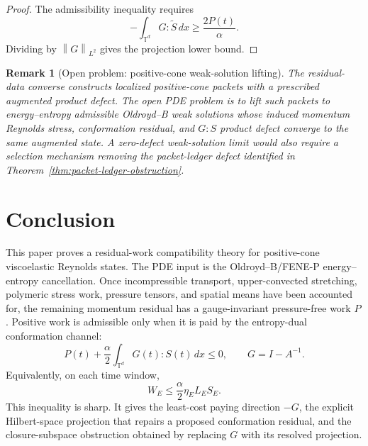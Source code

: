 \documentclass[11pt]{article}
\numberwithin{equation}{section}
\newtheorem{remark}[theorem]{Remark}
\newcommand{\T}{\mathbb T}
\newcommand{\norm}[1]{\left\lVert #1\right\rVert}
\begin{document}
\begin{proof}
The admissibility inequality requires
\[
  -\int_{\T^d}G:\widetilde S\,dx
  \ge \frac{2P(t)}{\alpha}.
\]
Dividing by \(\norm{G}_{L^2}\) gives the projection lower bound.
\end{proof}

\begin{remark}[Open problem: positive-cone weak-solution lifting]
\label{rem:realization-open}
The residual-data converse constructs localized positive-cone packets with a
prescribed augmented product defect.  The open PDE problem is to lift such
packets to energy--entropy admissible Oldroyd--B weak solutions whose induced
momentum Reynolds stress, conformation residual, and \(G:S\) product defect
converge to the same augmented state.  A zero-defect weak-solution limit would
also require a selection mechanism removing the packet-ledger defect identified
in Theorem~\ref{thm:packet-ledger-obstruction}.
\end{remark}

\section{Conclusion}

This paper proves a residual-work compatibility theory for positive-cone
viscoelastic Reynolds states.  The PDE input is the Oldroyd--B/FENE-P
energy--entropy cancellation.  Once incompressible transport, upper-convected
stretching, polymeric stress work, pressure tensors, and spatial means have
been accounted for, the remaining momentum residual has a gauge-invariant
pressure-free work \(P\).  Positive work is admissible only when it is paid by
the entropy-dual conformation channel:
\[
  P(t)+\frac{\alpha}{2}\int_{\T^d}G(t):S(t)\,dx\le0,
  \qquad G=I-A^{-1}.
\]
Equivalently, on each time window,
\[
  W_E\le \frac{\alpha}{2}\eta_E L_ES_E .
\]
This inequality is sharp.  It gives the least-cost paying direction \(-G\), the
explicit Hilbert-space projection that repairs a proposed conformation
residual, and the closure-subspace obstruction obtained by replacing \(G\) with
its resolved projection.
\end{document}
